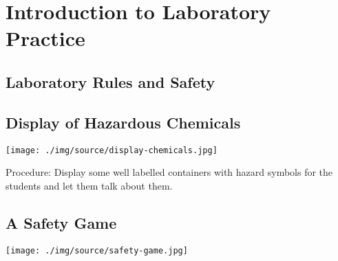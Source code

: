 \section{Introduction to Laboratory Practice}

\begin{multicols}{2}



\section*{Laboratory Rules and Safety}


\subsection{Display of Hazardous Chemicals}

\begin{center}
\texttt{[image: ./img/source/display-chemicals.jpg]}
\end{center}

\begin{description*}
\item[Procedure:]{Display some well labelled containers with
hazard symbols for the students and let them
talk about them.}
\end{description*}

\subsection{A Safety Game}

\begin{center}
\texttt{[image: ./img/source/safety-game.jpg]}
\end{center}


\end{multicols}
